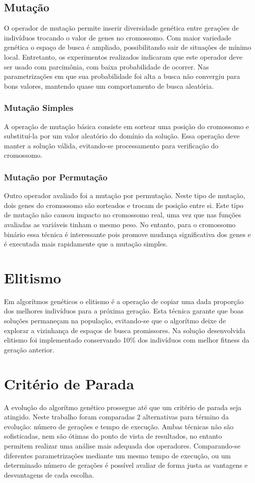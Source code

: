 \documentclass[conference]{IEEEtran}
\begin{document}
\subsection{Mutação}
O operador de mutação permite inserir diversidade genética entre gerações de
indivíduos trocando o valor de genes no cromossomo. Com maior variedade genética
o espaço de busca é ampliado, possibilitando sair de situações de mínimo local.
Entretanto, os experimentos realizados indicaram que este operador deve ser
usado com parcimônia, com baixa probabilidade de ocorrer. Nas parametrizações em
que sua probabilidade foi alta a busca não convergiu para bons valores, mantendo
quase um comportamento de busca aleatória.

\subsubsection{Mutação Simples}
A operação de mutação básica consiste em sortear uma posição do cromossomo e
substituí-la por um valor aleatório do domínio da solução. Essa operação deve
manter a solução válida, evitando-se processamento para verificação do
cromossomo.

\subsubsection{Mutação por Permutação}
Outro operador avaliado foi a mutação por permutação. Neste tipo de mutação,
dois genes do cromossomo são sorteados e trocam de posição entre si. Este tipo
de mutação não causou impacto no cromossomo real, uma vez que nas funções
avaliadas as variáveis tinham o mesmo peso. No entanto, para o cromossomo
binário essa técnica é interessante pois promove mudança significativa dos
genes e é executada mais rapidamente que a mutação simples.

\section{Elitismo}
Em algorítmos genéticos o elitismo é a operação de copiar uma dada proporção dos
melhores indivíduos para a próxima geração. Esta técnica garante que boas 
soluções permaneçam na população, evitando-se que o algorítmo deixe de explorar 
a vizinhança de espaços de busca promissores.
Na solução desenvolvida elitismo foi implementado conservando 10\% dos
indivíduos com melhor fitness da geração anterior.

\section{Critério de Parada}
A evolução do algorítmo genético prossegue até que um critério de parada
seja atingido. Neste trabalho foram comparadas 2 alternativas para término da
evolução: número de gerações e tempo de execução. Ambas técnicas não são
sofisticadas, nem são ótimas do ponto de vista de resultados, no entanto
permitem realizar uma análise mais adequada dos operadores. Comparando-se
diferentes parametrizações mediante um mesmo tempo de execução, ou um
determinado número de gerações é possível avaliar de forma justa as vantagens e
desvantagens de cada escolha.
\end{document}
